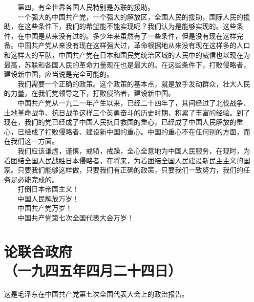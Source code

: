 \documentclass[cn,11pt,chinese]{elegantbook}
\def\myformat#1{\hfil\hfil #1}
\begin{document}
　　第四，有全世界各国人民特别是苏联的援助。\\
　　一个强大的中国共产党，一个强大的解放区，全国人民的援助，国际人民的援助，在这些条件下，我们的希望能不能实现呢？我们认为是能够实现的。这些条件，在中国是从来没有过的。多少年来虽然有了一些条件，但是没有现在这样完备。中国共产党从来没有现在这样强大过，革命根据地从来没有现在这样多的人口和这样大的军队，中国共产党在日本和国民党统治区域的人民中的威信也以现在为最高，苏联和各国人民的革命力量现在也是最大的。在这些条件下，打败侵略者，建设新中国，应当说是完全可能的。\\
　　我们需要一个正确的政策。这个政策的基本点，就是放手发动群众，壮大人民的力量，在我们党领导之下，打败侵略者，建设新中国。\\
　　中国共产党从一九二一年产生以来，已经二十四年了，其间经过了北伐战争、土地革命战争、抗日战争这样三个英勇奋斗的历史时期，积累了丰富的经验。到了现在，我们的党已经成了中国人民抗日救国的重心，已经成了中国人民解放的重心，已经成了打败侵略者、建设新中国的重心。中国的重心不在任何别的方面，而在我们这一方面。\\
　　我们应该谦虚，谨慎，戒骄，戒躁，全心全意地为中国人民服务，在现时，为着团结全国人民战胜日本侵略者，在将来，为着团结全国人民建设新民主主义的国家。只要我们能够这样做，只要我们有正确的政策，只要我们一致努力，我们的任务是必能完成的。\\
　　打倒日本帝国主义！\\
　　中国人民解放万岁！\\
　　中国共产党万岁！\\
　　中国共产党第七次全国代表大会万岁！\\
\newpage\section*{\myformat{论联合政府}\\\myformat{（一九四五年四月二十四日）}}
\begin{introduction}\item  这是毛泽东在中国共产党第七次全国代表大会上的政治报告。\end{introduction}
\end{document}
